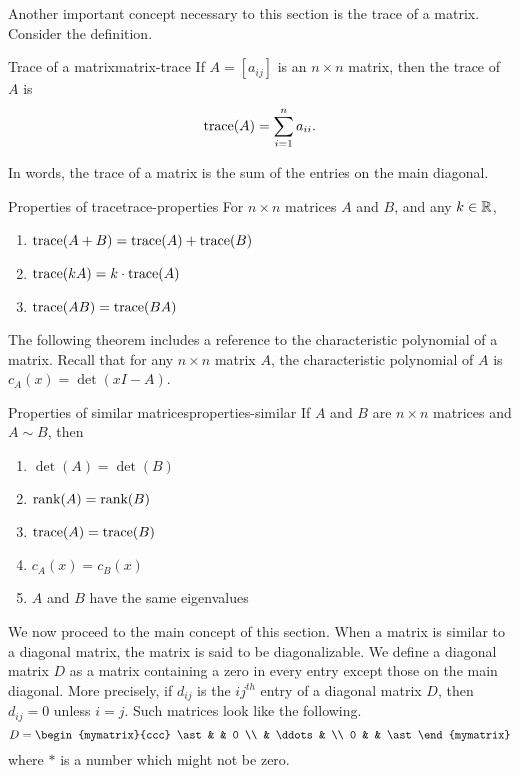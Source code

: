 Another important concept necessary to this section is the trace of a matrix. Consider the definition.

\begin{definition}{Trace of a matrix}{matrix-trace}
%
If $A=[a_{ij}]$ is an $n\times n$ matrix, then the
trace of $A$ is
\[ \mbox{\rm trace}(A) = \sum_{i=1}^n a_{ii}.\]
\end{definition}

In words, the trace of a matrix is the sum of the entries on the main diagonal. 

\begin{lemma}{Properties of trace}{trace-properties}
For $n\times n$ matrices $A$ and $B$, and any $k\in\mathbb{R}$,
\begin{enumerate}
\item $\mbox{\rm trace}(A+B)=\mbox{\rm trace}(A) + \mbox{\rm trace}(B)$
\item $\mbox{\rm trace}(kA)=k\cdot\mbox{\rm trace}(A)$
\item $\mbox{\rm trace}(AB)=\mbox{\rm trace}(BA)$
\end{enumerate}
\end{lemma}

The following theorem includes a reference to the characteristic polynomial of a matrix. Recall that for any $n \times n$ matrix $A$, the characteristic polynomial of $A$ is $c_A(x)=\det(xI-A)$.

\begin{theorem}{Properties of similar matrices}{properties-similar}
If $A$ and $B$ are $n\times n$ matrices and $A\sim B$, then
\begin{enumerate}
\item $\det(A) = \det(B)$
\item $\mbox{\rm rank}(A) = \mbox{\rm rank}(B)$
\item $\mbox{\rm trace}(A)= \mbox{\rm trace}(B)$
\item $c_A(x)=c_B(x)$
\item $A$ and $B$ have the same eigenvalues
\end{enumerate}
\end{theorem}

We now proceed to the main concept of this section. When a matrix is similar to a diagonal matrix, the matrix is said to
be
diagonalizable. 
We define a diagonal matrix $D$ as a matrix containing a zero in every entry 
except those on the main diagonal. More precisely, if $d_{ij}$ is the $ij^{th}$ entry of a diagonal matrix $D$, then
$d_{ij}=0$ unless $i=j$. Such
matrices look like the following.
\begin{equation*}
D = \begin{mymatrix}{ccc}
\ast &  & 0 \\
& \ddots &  \\
0 &  & \ast
\end{mymatrix}
\end{equation*}
where $\ast $ is a number which might not be zero.

